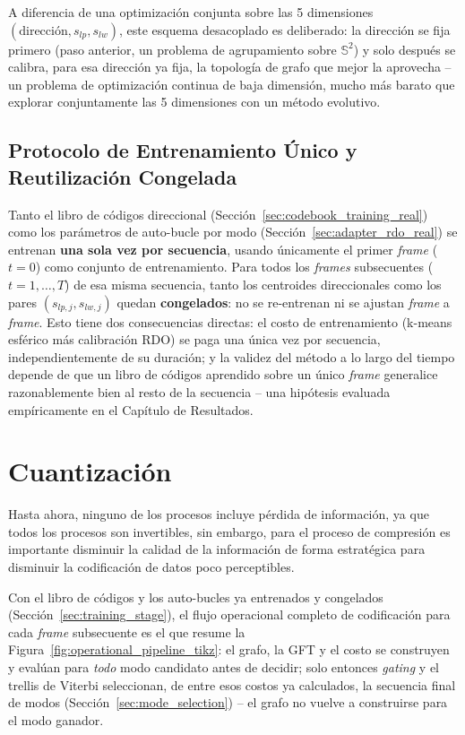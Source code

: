 A diferencia de una optimización conjunta sobre las 5 dimensiones $(\text{dirección}, s_{lp},
s_{lw})$, este esquema desacoplado es deliberado: la dirección se fija primero (paso anterior, un
problema de agrupamiento sobre $\mathbb{S}^2$) y solo después se calibra, para esa dirección ya
fija, la topología de grafo que mejor la aprovecha -- un problema de optimización continua de
baja dimensión, mucho más barato que explorar conjuntamente las 5 dimensiones con un método
evolutivo.

    \subsection{Protocolo de Entrenamiento Único y Reutilización Congelada}
        Tanto el libro de códigos direccional (Sección~\ref{sec:codebook_training_real}) como
        los parámetros de auto-bucle por modo (Sección~\ref{sec:adapter_rdo_real}) se entrenan
        \textbf{una sola vez por secuencia}, usando únicamente el primer \textit{frame}
        ($t=0$) como conjunto de entrenamiento. Para todos los \textit{frames} subsecuentes
        ($t=1,\dots,T$) de esa misma secuencia, tanto los centroides direccionales como los
        pares $(s_{lp,j}, s_{lw,j})$ quedan \textbf{congelados}: no se re-entrenan ni se ajustan
        \textit{frame} a \textit{frame}. Esto tiene dos consecuencias directas: el costo de
        entrenamiento (k-means esférico más calibración RDO) se paga una única vez por
        secuencia, independientemente de su duración; y la validez del método a lo largo del
        tiempo depende de que un libro de códigos aprendido sobre un único \textit{frame}
        generalice razonablemente bien al resto de la secuencia -- una hipótesis evaluada
        empíricamente en el Capítulo de Resultados.

\section{Cuantización}

    Hasta ahora, ninguno de los procesos incluye pérdida de información, ya que todos los procesos son invertibles, sin embargo, para el proceso de compresión es importante disminuir la calidad de la información de forma estratégica para disminuir la codificación de datos poco perceptibles.

    Con el libro de códigos y los auto-bucles ya entrenados y congelados
    (Sección~\ref{sec:training_stage}), el flujo operacional completo de codificación para cada
    \textit{frame} subsecuente es el que resume la Figura~\ref{fig:operational_pipeline_tikz}: el
    grafo, la GFT y el costo se construyen y evalúan para \emph{todo} modo candidato antes de
    decidir; solo entonces \textit{gating} y el trellis de Viterbi seleccionan, de entre esos
    costos ya calculados, la secuencia final de modos (Sección~\ref{sec:mode_selection}) -- el
    grafo no vuelve a construirse para el modo ganador.

